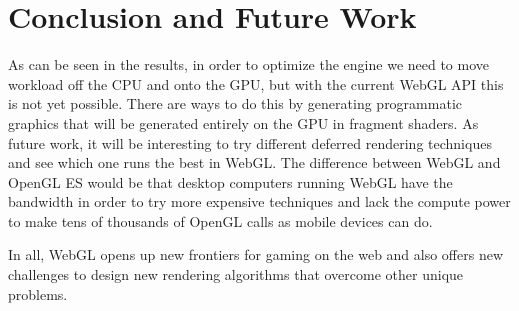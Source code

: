 \chapter{Conclusion and Future Work}
\label{chapter:Chapter 6}

As can be seen in the results, in order to optimize the engine we need to move workload off the CPU and onto the GPU, but with the current WebGL API this is not yet possible. There are ways to do this by generating programmatic graphics that will be generated entirely on the GPU in fragment shaders. 
As future work, it will be interesting to try different deferred rendering techniques and see which one runs the best in WebGL. The difference between WebGL and OpenGL ES would be that desktop computers running WebGL have the bandwidth in order to try more expensive techniques and lack the compute power to make tens of thousands of OpenGL calls as mobile devices can do. 

In all, WebGL opens up new frontiers for gaming on the web and also offers new challenges to design new rendering algorithms that overcome other unique problems.